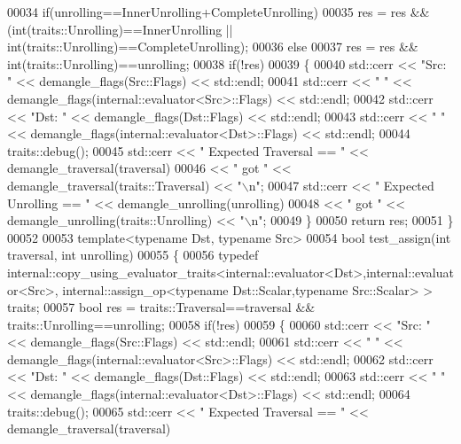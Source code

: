 \begin{DoxyCode}
00034   \textcolor{keywordflow}{if}(unrolling==InnerUnrolling+CompleteUnrolling)
00035     res = res && (int(traits::Unrolling)==InnerUnrolling || int(traits::Unrolling)==CompleteUnrolling);
00036   \textcolor{keywordflow}{else}
00037     res = res && int(traits::Unrolling)==unrolling;
00038   \textcolor{keywordflow}{if}(!res)
00039   \{
00040     std::cerr << \textcolor{stringliteral}{"Src: "} << demangle\_flags(Src::Flags) << std::endl;
00041     std::cerr << \textcolor{stringliteral}{"     "} << demangle\_flags(internal::evaluator<Src>::Flags) << std::endl;
00042     std::cerr << \textcolor{stringliteral}{"Dst: "} << demangle\_flags(Dst::Flags) << std::endl;
00043     std::cerr << \textcolor{stringliteral}{"     "} << demangle\_flags(internal::evaluator<Dst>::Flags) << std::endl;
00044     traits::debug();
00045     std::cerr << \textcolor{stringliteral}{" Expected Traversal == "} << demangle\_traversal(traversal)
00046               << \textcolor{stringliteral}{" got "} << demangle\_traversal(traits::Traversal) << \textcolor{stringliteral}{"\(\backslash\)n"};
00047     std::cerr << \textcolor{stringliteral}{" Expected Unrolling == "} << demangle\_unrolling(unrolling)
00048               << \textcolor{stringliteral}{" got "} << demangle\_unrolling(traits::Unrolling) << \textcolor{stringliteral}{"\(\backslash\)n"};
00049   \}
00050   \textcolor{keywordflow}{return} res;
00051 \}
00052 
00053 \textcolor{keyword}{template}<\textcolor{keyword}{typename} Dst, \textcolor{keyword}{typename} Src>
00054 \textcolor{keywordtype}{bool} test\_assign(\textcolor{keywordtype}{int} traversal, \textcolor{keywordtype}{int} unrolling)
00055 \{
00056   \textcolor{keyword}{typedef} internal::copy\_using\_evaluator\_traits<internal::evaluator<Dst>,internal::evaluator<Src>, 
      internal::assign\_op<typename Dst::Scalar,typename Src::Scalar> > traits;
00057   \textcolor{keywordtype}{bool} res = traits::Traversal==traversal && traits::Unrolling==unrolling;
00058   \textcolor{keywordflow}{if}(!res)
00059   \{
00060     std::cerr << \textcolor{stringliteral}{"Src: "} << demangle\_flags(Src::Flags) << std::endl;
00061     std::cerr << \textcolor{stringliteral}{"     "} << demangle\_flags(internal::evaluator<Src>::Flags) << std::endl;
00062     std::cerr << \textcolor{stringliteral}{"Dst: "} << demangle\_flags(Dst::Flags) << std::endl;
00063     std::cerr << \textcolor{stringliteral}{"     "} << demangle\_flags(internal::evaluator<Dst>::Flags) << std::endl;
00064     traits::debug();
00065     std::cerr << \textcolor{stringliteral}{" Expected Traversal == "} << demangle\_traversal(traversal)

\end{DoxyCode}
